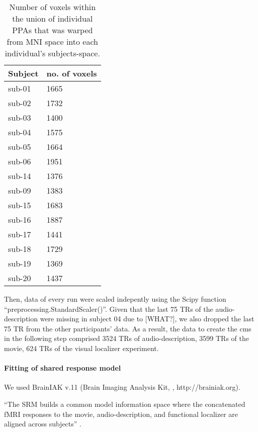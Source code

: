 \begin{table*}[btp]
\caption{Number of voxels within the union of individual PPAs that was warped
    from MNI space into each individual's subjects-space.}
\label{tab:ppamaskvoxels}
\begin{tabular}{ll}
\toprule
\textbf{Subject} & \textbf{no. of voxels} \\
\midrule
sub-01 & 1665 \tabularnewline
sub-02 & 1732 \tabularnewline
sub-03 & 1400 \tabularnewline
sub-04 & 1575 \tabularnewline
sub-05 & 1664 \tabularnewline
sub-06 & 1951 \tabularnewline
sub-14 & 1376 \tabularnewline
sub-09 & 1383 \tabularnewline
sub-15 & 1683 \tabularnewline
sub-16 & 1887 \tabularnewline
sub-17 & 1441 \tabularnewline
sub-18 & 1729 \tabularnewline
sub-19 & 1369 \tabularnewline
sub-20 & 1437 \tabularnewline
\bottomrule
\end{tabular}
\end{table*}

Then, data of every run were scaled indepently using the Scipy function
``preprocessing.StandardScaler()''.
Given that the last 75 TRs of the audio-description were missing in subject 04
due to [WHAT?], we also dropped the last 75 TR from the other participants'
data.
As a result, the data to create the \ac{cms} in the following step comprised
3524 TRs of audio-description, 3599 TRs of the movie, 624 TRs of the visual
localizer experiment.


\paragraph{Fitting of shared response model}



We used BrainIAK v.11 (Brain Imaging Analysis Kit, \citet{kumar2020brainiak,
kumar2020brainiaktutorial}, http://brainiak.org).

%
``The SRM builds a common model information space where the concatenated fMRI
responses to the movie, audio-description, and functional localizer are aligned
across subjects'' \citep{jiahui2020predicting}.

